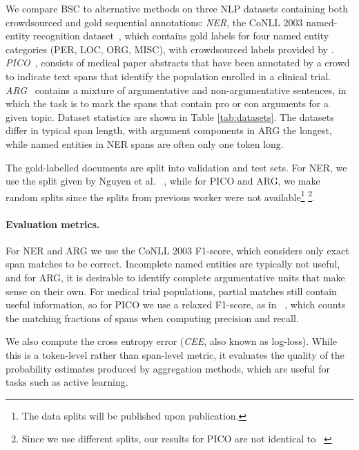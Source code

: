 We compare BSC to alternative methods on three NLP datasets
containing both crowdsourced and gold sequential annotations:
\emph{NER}, the CoNLL 2003 named-entity recognition dataset~\cite{tjong2003introduction},
which contains gold labels for four named entity categories (PER, LOC, ORG, MISC),
with crowdsourced labels provided by \cite{rodrigues2014sequence}.
\emph{PICO}~\cite{nguyen2017aggregating}, 
consists of medical paper abstracts that have been annotated by a crowd to indicate text spans that identify the population enrolled in a clinical trial. 
\emph{ARG}~\cite{trautmann2019robust} contains a mixture of argumentative and non-argumentative sentences, in which the task is to mark the spans 
that contain pro or con arguments for a given topic. 
Dataset statistics are shown in Table \ref{tab:datasets}. 
The datasets differ in typical span length, with argument components in ARG the longest, while named entities in NER spans are often only
one token long.

The gold-labelled documents are split into validation and test sets. 
For NER, we use the split given by Nguyen et al. ~,
while for PICO and ARG, we make random splits since the splits from previous worker
were not available\footnote{The data splits will be published upon publication.}
\footnote{Since we use different splits, our results for PICO are not identical to ~\citet{nguyen2017aggregating}}.

\paragraph{Evaluation metrics. }
For NER and ARG we use the CoNLL 2003 F1-score, which considers only exact span matches %
to be correct. Incomplete named entities are typically not useful, and for ARG, it is desirable to identify complete argumentative units that
make sense on their own. 
For medical trial populations, partial matches still contain useful information, so for PICO we use a relaxed F1-score, as in ~\citet{nguyen2017aggregating}, 
which counts the matching fractions of spans when computing precision and recall. 
 
We also compute the cross entropy error (\emph{CEE}, also known as log-loss).
While this is a token-level rather than span-level metric, it evaluates the quality of the probability estimates produced by aggregation methods, which are useful for tasks such as active learning.

